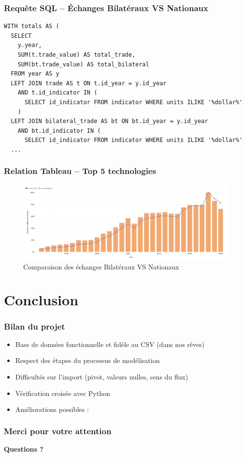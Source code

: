 \documentclass[11pt]{beamer}
\begin{document}
\begin{frame}[fragile]
  \frametitle{Requête SQL – Échanges Bilatéraux VS Nationaux}
  \begin{lstlisting}[style=sqlStyle, caption={Requête SQL pour Échanges Bilatéraux VS Nationaux}]
WITH totals AS (
  SELECT
    y.year,
    SUM(t.trade_value) AS total_trade,
    SUM(bt.trade_value) AS total_bilateral
  FROM year AS y
  LEFT JOIN trade AS t ON t.id_year = y.id_year
    AND t.id_indicator IN (
      SELECT id_indicator FROM indicator WHERE units ILIKE '%dollar%'
    )
  LEFT JOIN bilateral_trade AS bt ON bt.id_year = y.id_year
    AND bt.id_indicator IN (
      SELECT id_indicator FROM indicator WHERE units ILIKE '%dollar%'
  ...
  \end{lstlisting}
\end{frame}

\begin{frame}[fragile]
  \frametitle{Relation Tableau – Top 5 technologies}
  \begin{figure}
    \centering
    \includegraphics[width=1\linewidth]{./Images/échanges_bilatéraux_VS_nationaux}
    \caption{Comparaison des échanges Bilatéraux VS Nationaux}
  \end{figure}
\end{frame}

\section{Conclusion}
\begin{frame}
  \frametitle{Bilan du projet}
  \begin{itemize}
    \item Base de données fonctionnelle et fidèle au CSV (dans nos rêves)
    \item Respect des étapes du processus de modélisation
    \item Difficultés sur l’import (pivot, valeurs nulles, sens du flux)
    \item Vérification croisée avec Python
    \item Améliorations possibles :
  \end{itemize}
\end{frame}

\begin{frame}
  \frametitle{Merci pour votre attention}
  \begin{center}
    \huge \textbf{Questions ?}
  \end{center}
\end{frame}
\end{document}
